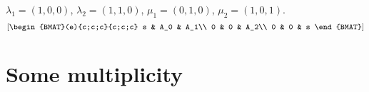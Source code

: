 \documentclass{article}
\begin{document}
\begin{example}
$\lambda_1 = (1,0,0)$, $\lambda_2 = (1,1,0)$, $\mu_1 = (0,1,0)$, $\mu_2 = (1,0,1)$.  
\[
\left[\begin{BMAT}(e){c;c;c}{c;c;c} 
    s & A_0 & A_1\\
    0 & 0 & A_2\\
    0 & 0 & s
\end{BMAT}\right]    
\]
% 

\end{example}

\section{Some multiplicity}
\end{document}
